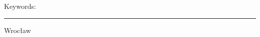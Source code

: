 {\begin{titlepage}
    \vspace*{\fill}

    {\raggedright
      \small Keywords: \textit{\stSlowaKluczowe}\par
      \vspace{0.5em}
      \par\noindent\rule{\textwidth}{1pt}\par
    }

    \begin{center}
      \Large Wrocław \stRok
    \end{center}

    \restoregeometry
  \end{titlepage}
  \normalfont
  \pagestyle{plain} %
}

\renewcommand{\SetMetaData}{%
  \AtBeginDocument{%
    \hypersetup{%
      pdfinfo = {%
        Title    = {\stTytulAng},
        Author   = {\stAutor},
        Subject  = {\ifnum\stCzyMgr=1 Master's thesis\else Engineering thesis\fi},
        Keywords = {\stSlowaKluczowe},
        ModDate  = {\pdfcreationdate},
        Creator  = {pdftex}
      }
    }
  }
}

\renewenvironment{abstracts}{}{\selectlanguage{english}\clearpage}
\renewcommand{\AbstractPL}{%
  \selectlanguage{polish}%
  \begin{center}{\Large\bfseries Streszczenie \par}\end{center}\vspace{0.5em}%
}

\renewcommand{\SpisTresci}{\clearpage\tableofcontents\clearpage}

\ifstAlgorithms {} \fi
